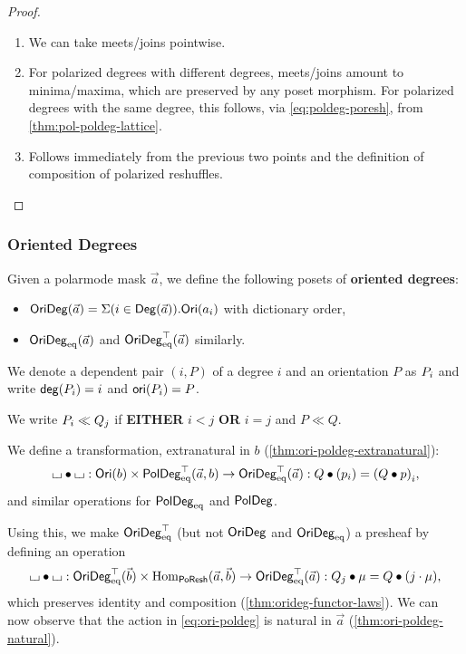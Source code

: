 \documentclass[a4paper]{memoir}
\begin{document}
\begin{proof}
	\begin{enumerate}
		\item We can take meets/joins pointwise.
		\item For polarized degrees with different degrees, meets/joins amount to minima/maxima, which are preserved by any poset morphism.
		For polarized degrees with the same degree, this follows, via \cref{eq:poldeg-poresh}, from \cref{thm:pol-poldeg-lattice}.
		\item Follows immediately from the previous two points and the definition of composition of polarized reshuffles. \qedhere
	\end{enumerate}
\end{proof}

\subsubsection{Oriented Degrees}
\begin{definition}
	Given a polarmode mask $\vec a$, we define the following posets of \textbf{oriented degrees}:
	\begin{itemize}
		\item $\mathsf{OriDeg}(\vec a) = \Sigma(i \in {\mathsf{Deg}}(\vec a)).{\mathsf{Ori}}(a_i)$ with dictionary order,
		\item $\mathsf{OriDeg}_{\mathrm{eq}}(\vec a)$ and $\mathsf{OriDeg}_{\mathrm{eq}}^\top(\vec a)$ similarly.
	\end{itemize}
	We denote a dependent pair $(i, P)$ of a degree $i$ and an orientation $P$ as ${P}_{i}$ and write $\mathsf{deg}({P}_{i}) = i$ and $\mathsf{ori}({P}_{i}) = P$.
	
	We write ${P}_{i} \ll {Q}_{j}$ if \textbf{EITHER} $i < j$ \textbf{OR} $i = j$ and $P \ll Q$.
	
	We define a transformation, extranatural in $b$ (\cref{thm:ori-poldeg-extranatural}):
	\begin{equation}
		{\llcorner\hspace{-.4ex}\lrcorner} \mathbin{\bullet} {\llcorner\hspace{-.4ex}\lrcorner} : {\mathsf{Ori}}(b) \times \mathsf{PolDeg}_{\mathrm{eq}}^\top(\vec a, b) \to \mathsf{OriDeg}_{\mathrm{eq}}^\top(\vec a) : Q \mathbin{\bullet} ({p}_{i}) = {(Q \mathbin{\bullet} p)}_{i}, \label{eq:ori-poldeg}
	\end{equation}
	and similar operations for $\mathsf{PolDeg}_{\mathrm{eq}}$ and $\mathsf{PolDeg}$.
	
	Using this, we make $\mathsf{OriDeg}_{\mathrm{eq}}^\top$ (but not $\mathsf{OriDeg}$ and $\mathsf{OriDeg}_{\mathrm{eq}}$) a presheaf by defining an operation
	\begin{equation} \label{eq:orideg-poresh}
		{\llcorner\hspace{-.4ex}\lrcorner} \mathbin{\bullet} {\llcorner\hspace{-.4ex}\lrcorner} : \mathsf{OriDeg}_{\mathrm{eq}}^\top(\vec b) \times {\mathrm{Hom}}_{\mathsf{PoResh}}(\vec a, \vec b) \to \mathsf{OriDeg}_{\mathrm{eq}}^\top(\vec a) : Q_j \mathbin{\bullet} \mu = Q \mathbin{\bullet} (j \cdot \mu),
	\end{equation}
	which preserves identity and composition (\cref{thm:orideg-functor-laws}).
	We can now observe that the action in \cref{eq:ori-poldeg} is natural in $\vec a$ (\cref{thm:ori-poldeg-natural}).
\end{definition}
\end{document}
